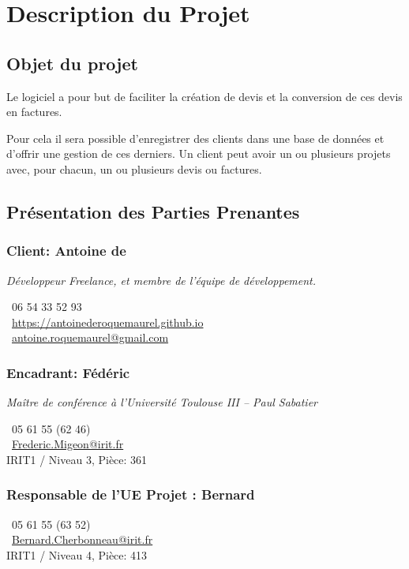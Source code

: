 \chapter{Description du Projet}
\section{Objet du projet}
Le logiciel a pour but de faciliter la création de devis et la conversion de ces devis en factures. 

Pour cela il sera possible d’enregistrer des
clients dans une base de données et d’offrir une gestion de ces derniers. Un client peut avoir un ou plusieurs projets avec, pour chacun, un ou
plusieurs devis ou factures.

\section{Présentation des Parties Prenantes}
	\subsection{Client: Antoine de }
	\textit{Développeur Freelance, et membre de l'équipe de développement. }

		\Telefon~06 54 33 52 93\\
		\Mundus~\url{https://antoinederoquemaurel.github.io}\\
		\Letter~\href{mailto:antoine.roquemaurel@gmail.com}{antoine.roquemaurel@gmail.com} \\		
	\subsection{Encadrant: Fédéric }
	\textit{Maître de conférence à l'Université Toulouse III -- Paul Sabatier}

		\Telefon~05 61 55 (62 46) \\
		\Letter~\href{mailto:Frederic.Migeon@irit.fr}{Frederic.Migeon@irit.fr} \\
		IRIT1 / Niveau 3, Pièce: 361 \\

		\subsection{Responsable de l'UE Projet : Bernard }
		\Telefon~05 61 55 (63 52)\\
		\Letter~\href{mailto:Bernard.Cherbonneau@irit.fr}{Bernard.Cherbonneau@irit.fr}\\
		IRIT1 / Niveau 4, Pièce: 413

